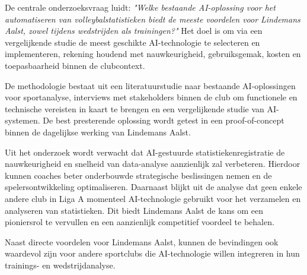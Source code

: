 De centrale onderzoeksvraag luidt: \textit{"Welke bestaande AI-oplossing voor het automatiseren van volleybalstatistieken biedt de meeste voordelen voor Lindemans Aalst, zowel tijdens wedstrijden als trainingen?"} Het doel is om via een vergelijkende studie de meest geschikte AI-technologie te selecteren en implementeren, rekening houdend met nauwkeurigheid, gebruiksgemak, kosten en toepasbaarheid binnen de clubcontext.

De methodologie bestaat uit een literatuurstudie naar bestaande AI-oplossingen voor sportanalyse, interviews met stakeholders binnen de club om functionele en technische vereisten in kaart te brengen en een vergelijkende studie van AI-systemen. De best presterende oplossing wordt getest in een proof-of-concept binnen de dagelijkse werking van Lindemans Aalst.

Uit het onderzoek wordt verwacht dat AI-gestuurde statistiekenregistratie de nauwkeurigheid en snelheid van data-analyse aanzienlijk zal verbeteren. Hierdoor kunnen coaches beter onderbouwde strategische beslissingen nemen en de spelersontwikkeling optimaliseren. Daarnaast blijkt uit de analyse dat geen enkele andere club in Liga A momenteel AI-technologie gebruikt voor het verzamelen en analyseren van statistieken. Dit biedt Lindemans Aalst de kans om een pioniersrol te vervullen en een aanzienlijk competitief voordeel te behalen.

Naast directe voordelen voor Lindemans Aalst, kunnen de bevindingen ook waardevol zijn voor andere sportclubs die AI-technologie willen integreren in hun trainings- en wedstrijdanalyse.
